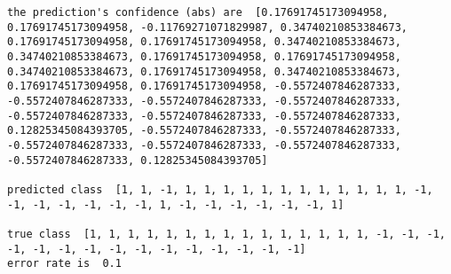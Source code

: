 \documentclass[11pt]{article}
\begin{document}
    \begin{Verbatim}[commandchars=\\\{\}]
the prediction's confidence (abs) are  [0.17691745173094958, 0.17691745173094958, -0.11769271071829987, 0.34740210853384673, 0.17691745173094958, 0.17691745173094958, 0.34740210853384673, 0.34740210853384673, 0.17691745173094958, 0.17691745173094958, 0.34740210853384673, 0.17691745173094958, 0.34740210853384673, 0.17691745173094958, 0.17691745173094958, -0.5572407846287333, -0.5572407846287333, -0.5572407846287333, -0.5572407846287333, -0.5572407846287333, -0.5572407846287333, -0.5572407846287333, 0.12825345084393705, -0.5572407846287333, -0.5572407846287333, -0.5572407846287333, -0.5572407846287333, -0.5572407846287333, -0.5572407846287333, 0.12825345084393705] 

predicted class  [1, 1, -1, 1, 1, 1, 1, 1, 1, 1, 1, 1, 1, 1, 1, -1, -1, -1, -1, -1, -1, -1, 1, -1, -1, -1, -1, -1, -1, 1] 

true class  [1, 1, 1, 1, 1, 1, 1, 1, 1, 1, 1, 1, 1, 1, 1, -1, -1, -1, -1, -1, -1, -1, -1, -1, -1, -1, -1, -1, -1, -1]
error rate is  0.1

    \end{Verbatim}
\end{document}
